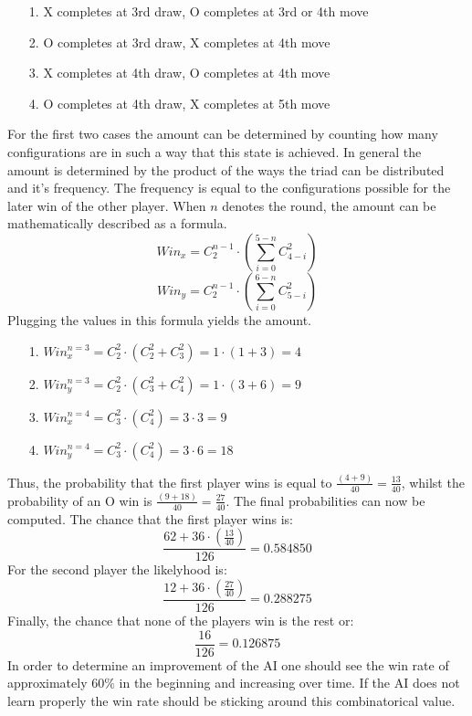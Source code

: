 \documentclass[12pt]{article}
\begin{document}
\begin{itemize}
    \item [1.]{X completes at 3rd draw, O completes at 3rd or 4th move}
    \item [2.]{O completes at 3rd draw, X completes at 4th move}
    \item [3.]{X completes at 4th draw, O completes at 4th move}
    \item [4.]{O completes at 4th draw, X completes at 5th move}
\end{itemize}
For the first two cases the amount can be determined by counting how many configurations are in such a way that this state is achieved. In general the amount is determined by the product of the ways the triad can be distributed and it's frequency. The frequency is equal to the configurations possible for the later win of the other player. When $n$ denotes the round, the amount can be mathematically described as a formula.
\begin{equation}
   Win_{x} = C_{2}^{n-1} \cdot \left ( \sum _{i = 0}^{5 - n} C_{4-i}^{2} \right )
 \end{equation}
 \begin{equation}
      Win_{y} = C_{2}^{n-1} \cdot \left ( \sum _{i = 0}^{6 - n} C_{5-i}^{2} \right )
\end{equation}
Plugging the values in this formula yields the amount.
\begin{itemize}
    \item [1.]{$ Win_{x}^{n=3} = C_{2}^{2} \cdot \left ( C_{2}^{2} + C_{3}^{2}  \right ) = 1 \cdot (1+3) = 4$}
    \item [2.]{ $Win_{y}^{n=3} = C_{2}^{2} \cdot \left ( C_{3}^{2} + C_{4}^{2}  \right ) = 1 \cdot (3+6) = 9$}
    \item [3.]{$   Win_{x}^{n=4} = C_{3}^{2} \cdot \left ( C_{4}^{2} \right ) = 3 \cdot 3 = 9$}
    \item [4.]{$   Win_{y}^{n=4} = C_{3}^{2} \cdot \left ( C_{4}^{2} \right ) = 3 \cdot 6 = 18$}
\end{itemize}
Thus, the probability that the first player wins is equal to $\frac{(4+9)}{40} = \frac{13}{40}$, whilst the probability of an O win is $\frac{(9+18)}{40} = \frac{27}{40}$.
The final probabilities can now be computed. The chance that the first player wins is:
\begin{equation}\nonumber
 \frac{62 + 36 \cdot \left ( \frac{13}{40} \right ) }{126} =  0.584850 
\end{equation}
For the second player the likelyhood is:
\begin{equation}\nonumber
 \frac{12 + 36 \cdot \left ( \frac{27}{40} \right ) }{126} =  0.288275 
\end{equation}
Finally, the chance that none of the players win is the rest or:
\begin{equation}\nonumber
\frac{16}{126} = 0.126875
\end{equation}
In order to determine an improvement of the AI one should see the win rate of approximately $ 60\% $ in the beginning and increasing over time. If the AI does not learn properly the win rate should be sticking around this combinatorical value.
\end{document}
